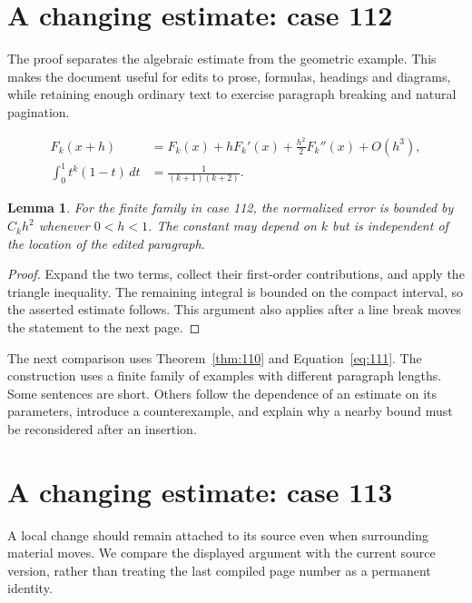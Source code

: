 \documentclass[a4paper,10pt]{article}
\newtheorem{lemma}[theorem]{Lemma}
\begin{document}
\lipsum[3]

\section{A changing estimate: case 112}\label{unit:111}
The proof separates the algebraic estimate from the geometric example. This makes the document useful for edits to prose, formulas, headings and diagrams, while retaining enough ordinary text to exercise paragraph breaking and natural pagination.

\lipsum[4-5]
\begin{align}\label{eq:111}
 F_k(x+h)&=F_k(x)+hF_k'(x)+\frac{h^2}{2}F_k''(x)+O(h^3),\\
 \int_0^1 t^k(1-t)\,dt&=\frac{1}{(k+1)(k+2)}.
\end{align}
\begin{lemma}\label{thm:111}
For the finite family in case 112, the normalized error is bounded by $C_k h^2$ whenever $0<h<1$. The constant may depend on $k$ but is independent of the location of the edited paragraph.
\end{lemma}
\begin{proof}
Expand the two terms, collect their first-order contributions, and apply the
triangle inequality. The remaining integral is bounded on the compact interval,
so the asserted estimate follows. This argument also applies after a line break
moves the statement to the next page.
\end{proof}
\begin{center}
\end{center}
The next comparison uses Theorem~\ref{thm:110} and Equation~\ref{eq:111}. The construction uses a finite family of examples with different paragraph lengths. Some sentences are short. Others follow the dependence of an estimate on its parameters, introduce a counterexample, and explain why a nearby bound must be reconsidered after an insertion.

\lipsum[8]

\section{A changing estimate: case 113}\label{unit:112}
A local change should remain attached to its source even when surrounding material moves. We compare the displayed argument with the current source version, rather than treating the last compiled page number as a permanent identity.
\end{document}
